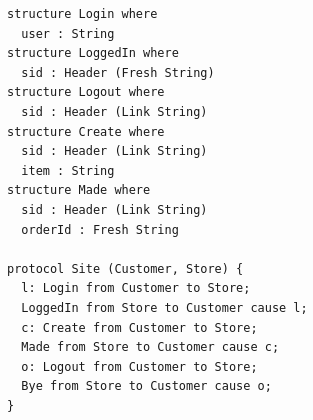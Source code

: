 \begin{lstlisting}[language={},basicstyle=\ttfamily\footnotesize,breaklines=true]
structure Login where
  user : String
structure LoggedIn where
  sid : Header (Fresh String)
structure Logout where
  sid : Header (Link String)
structure Create where
  sid : Header (Link String)
  item : String
structure Made where
  sid : Header (Link String)
  orderId : Fresh String

protocol Site (Customer, Store) {
  l: Login from Customer to Store;
  LoggedIn from Store to Customer cause l;
  c: Create from Customer to Store;
  Made from Store to Customer cause c;
  o: Logout from Customer to Store;
  Bye from Store to Customer cause o;
}
\end{lstlisting}
